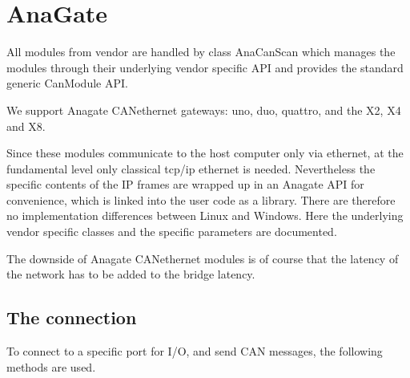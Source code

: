 \documentclass[a4paper,10pt,english]{sphinxmanual}
\begin{document}
\begin{sphinxVerbatim}[commandchars=\\\{\}]
     
      
  
  
\end{sphinxVerbatim}


\chapter{AnaGate}
\label{\detokenize{vendors/anagate:anagate}}\label{\detokenize{vendors/anagate::doc}}
All modules from vendor {\hyperref[\detokenize{vendors/anagate:anagate}]{}} are handled by class AnaCanScan which manages the modules through their underlying vendor specific API and provides
the standard generic CanModule API.

We support Anagate CAN\sphinxhyphen{}ethernet gateways: uno, duo, quattro, and the X2, X4 and X8.

Since these modules communicate to the host computer only via ethernet, at the fundamental level only classical
tcp/ip ethernet is needed. Nevertheless the specific contents of the IP frames are wrapped up in an Anagate API for convenience, which is linked
into the user code as a library. There are therefore no implementation differences between Linux and Windows.
Here the underlying vendor specific classes and the specific parameters are documented.

The downside of Anagate CAN\sphinxhyphen{}ethernet modules is of course that the latency of the network has to be added to the bridge latency.


\section{The connection}
\label{\detokenize{vendors/anagate:the-connection}}
To connect to a specific port for I/O, and send CAN messages, the following methods are used.
\end{document}

